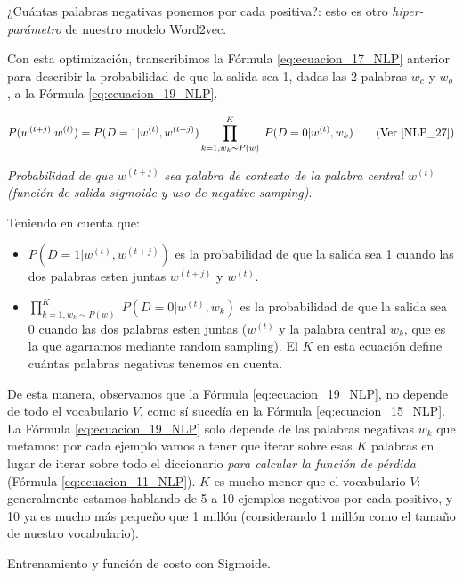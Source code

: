 \documentclass[12pt,a4paper]{article}
\makeatletter
\renewcommand\paragraph{\@startsection{paragraph}{4}{\z@}
            {-2.5ex\@plus -1ex \@minus -.25ex}
            {1.25ex \@plus .25ex}
            {\normalfont\normalsize\bfseries}}
\makeatother
\begin{document}
\begin{sloppypar}
¿Cuántas palabras negativas ponemos por cada positiva?: esto es otro \textit{hiper-parámetro} de nuestro modelo Word2vec. 

Con esta optimización, transcribimos la Fórmula \ref{eq:ecuacion_17_NLP} anterior para describir la probabilidad de que la salida sea 1, dadas las 2 palabras $w_c$ y $w_o$, a la Fórmula \ref{eq:ecuacion_19_NLP}.

\begin{equation}\label{eq:ecuacion_19_NLP}
P(w^{(t+j)} | w^{(t)}) = P(D=1 | w^{(t)}, w^{(t+j)})  \prod_{k=1, w_k \sim P(w)}^{K} \; P(D=0 | w^{(t)}, w_k)     \qquad \text{(Ver \cite{NLP_27})}
\end{equation}
\begin{center}
\textit{Probabilidad de que $w^{(t+j)}$ sea palabra de contexto de la palabra central $w^{(t)}$ \\ (función de salida sigmoide y uso de negative samping)}.
\end{center}

Teniendo en cuenta que:
\begin{itemize}
\item $P(D=1 | w^{(t)}, w^{(t+j)})$ es la probabilidad de que la salida sea 1 cuando las dos palabras esten juntas $w^{(t+j)}$ y $w^{(t)}$.
\item $\prod_{k=1, w_k \sim P(w)}^{K} \; P(D=0 | w^{(t)}, w_k)$ es la probabilidad de que la salida sea 0 cuando las dos palabras esten juntas ($w^{(t)}$ y la palabra central $w_k$, que es la que agarramos mediante random sampling). El $K$ en esta ecuación define cuántas palabras negativas tenemos en cuenta. 
\end{itemize}

De esta manera, observamos que la Fórmula \ref{eq:ecuacion_19_NLP}, no depende de todo el vocabulario $V$, como sí sucedía en la Fórmula \ref{eq:ecuacion_15_NLP}. La Fórmula \ref{eq:ecuacion_19_NLP} solo depende de las palabras negativas $w_k$ que metamos: por cada ejemplo vamos a tener que iterar sobre esas $K$ palabras en lugar de iterar sobre todo el diccionario \textit{para calcular la función de pérdida} (Fórmula \ref{eq:ecuacion_11_NLP}). $K$ es mucho menor que el vocabulario $V$: generalmente estamos hablando de 5 a 10 ejemplos negativos por cada positivo, y 10 ya es mucho más pequeño que 1 millón (considerando 1 millón como el tamaño de nuestro vocabulario).

\cleardoublepage

\paragraph{Entrenamiento y función de costo con Sigmoide.}\label{ent_costo_sigmoide}


\end{sloppypar}
\end{document}
